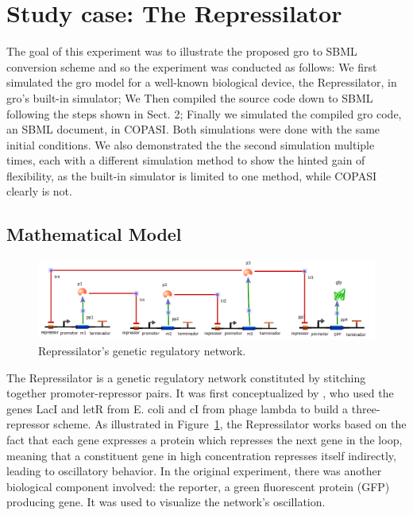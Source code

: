 \documentclass[12pt]{article}
\begin{document}
\section{Study case: The Repressilator}

    The goal of this experiment was to illustrate the proposed gro to SBML conversion scheme and so the experiment was conducted as follows: We first simulated the gro model for a well-known biological device, the Repressilator, in gro's built-in simulator; We Then compiled the source code down to SBML following the steps shown in Sect. 2; Finally we simulated the compiled gro code, an SBML document, in COPASI. Both simulations were done with the same initial conditions. We also demonstrated the the second simulation multiple times, each with a different simulation method to show the hinted gain of flexibility, as the built-in simulator is limited to one method, while COPASI clearly is not.


\subsection{Mathematical Model}

    \begin{figure}[h]
        \centering
        \includegraphics[scale = 0.7]{repressilator_model.png}
        \caption{Repressilator's genetic regulatory network.}
        \label{fig:repressilator_model}
    \end{figure}
    
    The Repressilator is a genetic regulatory network constituted by stitching together promoter-repressor pairs. It was first conceptualized by \cite{Elowitz2000}, who used the genes LacI and letR from E. coli and cI from phage lambda to build a three-repressor scheme. As illustrated in Figure~\ref{fig:repressilator_model}, the Repressilator works based on the fact that each gene expresses a protein which represses the next gene in the loop, meaning that a constituent gene in high concentration represses itself indirectly, leading to oscillatory behavior. In the original experiment, there was another biological component involved: the reporter, a green fluorescent protein (GFP) producing gene. It was used to visualize the network's oscillation.
    
\end{document}
